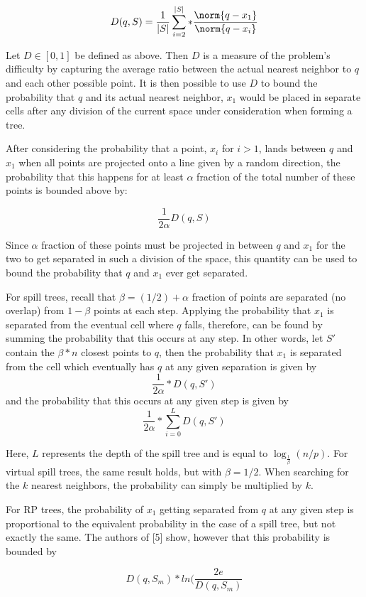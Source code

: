 $$D(q,S)=\frac{1}{|S|}\sum_{i=2}^{|S|}*\frac{\norm{q-x_1}}{\norm{q-x_i}}$$

Let $D\in[0,1]$ be defined as above. Then $D$ is a measure of the problem's difficulty by capturing the average ratio between the actual nearest neighbor to $q$ and each other possible point. It is then possible to use $D$ to bound the probability that $q$ and its actual nearest neighbor, $x_1$ would be placed in separate cells after any division of the current space under consideration when forming a tree. 

After considering the probability that a point, $x_i$ for $i>1$, lands between $q$ and $x_1$ when all points are projected onto a line given by a random direction, the probability that this happens for at least $\alpha$ fraction of the total number of these points is bounded above by:

$$\frac{1}{2\alpha}D(q,S)$$

Since $\alpha$ fraction of these points must be projected in between $q$ and $x_1$ for the two to get separated in such a division of the space, this quantity can be used to bound the probability that $q$ and $x_1$ ever get separated.

For spill trees, recall that $\beta=(1/2)+\alpha$ fraction of points are separated (no overlap) from $1-\beta$ points at each step. Applying the probability that $x_1$ is separated from the eventual cell where $q$ falls, therefore, can be found by summing the probability that this occurs at any step. In other words, let $S'$ contain the $\beta*n$ closest points to $q$, then the probability that $x_1$ is separated from the cell which eventually has $q$ at any given separation is given by $$\frac{1}{2\alpha}*D(q,S')$$
and the probability that this occurs at any given step is given by
$$\frac{1}{2\alpha}*\sum_{i=0}^{L}D(q,S')$$

\noindent
Here, $L$ represents the depth of the spill tree and is equal to $\log_{\frac{1}{\beta}}(n/p)$. For virtual spill trees, the same result holds, but with $\beta =1/2$. When searching for the $k$ nearest neighbors, the probability can simply be multiplied by $k$. 

\noindent
For RP trees, the probability of $x_1$ getting separated from $q$ at any given step is proportional to the equivalent probability in the case of a spill tree, but not exactly the same. The authors of [5] show, however that this probability is bounded by

$$D(q,S_m)*ln(\frac{2e}{D(q,S_m)}$$

